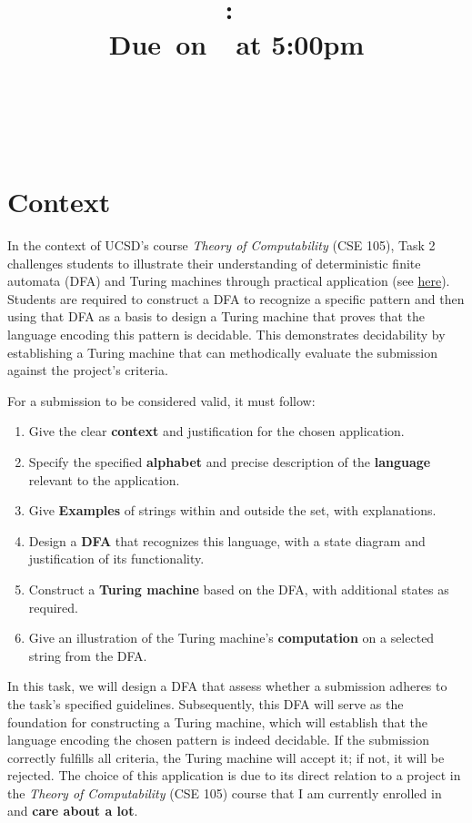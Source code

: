 \documentclass{article}
\title{
    \vspace{2in}
    \textmd{\textbf{\hmwkClass:\ \hmwkTitle}}\\
    \normalsize\vspace{0.1in}\small{Due\ on\ \hmwkDueDate\ at 5:00pm}\\
    \vspace{0.1in}\large{\textit{\hmwkClassInstructor}} \\
    \vspace{3in}
}
\author{
  \hmwkAuthorName \\
  \vspace{0.1in}\small\hmwkPID
}
\date{}
\begin{document}
\maketitle

\pagebreak

\section*{Context}

In the context of UCSD's course \textit{Theory of Computability} (CSE 105), Task 2 challenges students to illustrate their understanding of deterministic finite automata (DFA) and Turing machines through practical application (see \href{https://theory-cs.github.io/output/assignments/projectCSE105W24.html#task-2-illustrating-a-theorem}{here}). Students are required to construct a DFA to recognize a specific pattern and then using that DFA as a basis to design a Turing machine that proves that the language encoding this pattern is decidable. This demonstrates decidability by establishing a Turing machine that can methodically evaluate the submission against the project's criteria.

For a submission to be considered valid, it must follow:

\begin{enumerate}[Step 1 -]
  \item Give the clear \textbf{context} and justification for the chosen application.
  \item Specify the specified \textbf{alphabet} and precise description of the \textbf{language} relevant to the application.
  \item Give \textbf{Examples} of strings within and outside the set, with explanations.
  \item Design a \textbf{DFA} that recognizes this language, with a state diagram and justification of its functionality.
  \item Construct a \textbf{Turing machine} based on the DFA, with additional states as required.
  \item Give an illustration of the Turing machine's \textbf{computation} on a selected string from the DFA.
\end{enumerate}

In this task, we will design a DFA that assess whether a submission adheres to the task's specified guidelines. Subsequently, this DFA will serve as the foundation for constructing a Turing machine, which will establish that the language encoding the chosen pattern is indeed decidable. If the submission correctly fulfills all criteria, the Turing machine will accept it; if not, it will be rejected. The choice of this application is due to its direct relation to a project in the \textit{Theory of Computability} (CSE 105) course that I am currently enrolled in and \textbf{care about a lot}.
\end{document}
